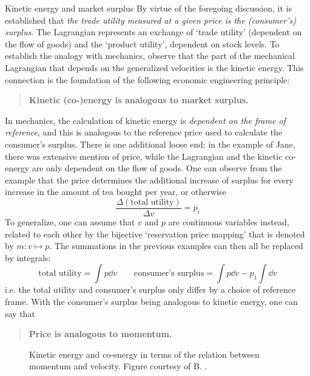 \begin{econ}{Kinetic energy and market surplus}
   By virtue of the foregoing discussion, it is established that \emph{the trade utility measured at a given price is the (consumer's) surplus}. The Lagrangian represents an exchange of `trade utility' (dependent on the flow of goods) and the `product utility', dependent on stock levels. To establish the analogy with mechanics, observe that the part of the mechanical Lagrangian that depends on the generalized velocities is the kinetic energy. This connection is the foundation of the following economic engineering principle:
    \begin{quote}
        \textbf{Kinetic (co-)energy is analogous to market surplus.}
    \end{quote}
    In mechanics, the calculation of kinetic energy is \emph{dependent on the frame of reference}, and this is analogous to the reference price used to calculate the consumer's surplus. There is one additional loose end: in the example of Jane, there was extensive mention of price, while the Lagrangian and the kinetic co-energy are only dependent on the flow of goods. One can observe from the example that the price determines the additional increase of surplus for every increase in the amount of tea bought per year, or otherwise
    $$
        \frac{\Delta (\text{total utility})}{\Delta v} = p_i
    $$
    To generalize, one can assume that $v$ and $p$ are continuous variables instead, related to each other by the bijective `reservation price mapping' that is denoted by $m: v \mapsto p$. The summations in the previous examples can then all be replaced by integrals:
    $$ 
        \text{total utility} = \int p\dd{v} \qquad 
        \text{consumer's surplus} = \int p\dd{v} - p_1\int \dd{v}
    $$ 
    i.e. the total utility and consumer's surplus only differ by a choice of reference frame. With the consumer's surplus being analogous to kinetic energy, one can say that
    \begin{quote}
        \textbf{Price is analogous to momentum.}
    \end{quote}
\end{econ}

\begin{figure}[ht]
    \centering
    
    \caption{Kinetic energy and co-energy in terms of the relation between momentum and velocity. Figure courtesy of B. \citet{Krabbenborg2021}.}
    \label{fig:kinetic_energy}
\end{figure}

